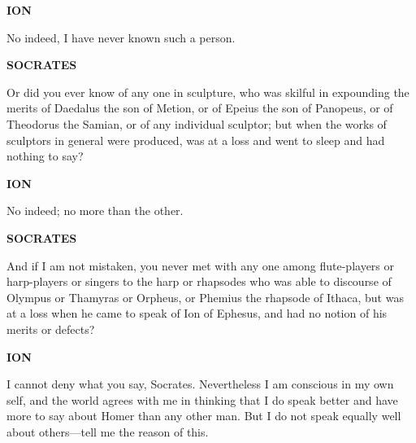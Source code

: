 \documentclass[11pt,letter]{article}
\begin{document}
\par \textbf{ION}
\par   No indeed, I have never known such a person.

\par \textbf{SOCRATES}
\par   Or did you ever know of any one in sculpture, who was skilful in expounding the merits of Daedalus the son of Metion, or of Epeius the son of Panopeus, or of Theodorus the Samian, or of any individual sculptor; but when the works of sculptors in general were produced, was at a loss and went to sleep and had nothing to say?

\par \textbf{ION}
\par   No indeed; no more than the other.

\par \textbf{SOCRATES}
\par   And if I am not mistaken, you never met with any one among flute-players or harp-players or singers to the harp or rhapsodes who was able to discourse of Olympus or Thamyras or Orpheus, or Phemius the rhapsode of Ithaca, but was at a loss when he came to speak of Ion of Ephesus, and had no notion of his merits or defects?

\par \textbf{ION}
\par   I cannot deny what you say, Socrates. Nevertheless I am conscious in my own self, and the world agrees with me in thinking that I do speak better and have more to say about Homer than any other man. But I do not speak equally well about others—tell me the reason of this.
\end{document}
